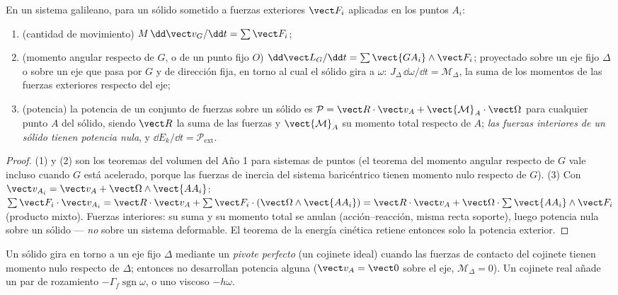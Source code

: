 \begin{theorem}\label{thm:b2:rigid-body-mechanics:laws}
En un sistema galileano, para un sólido sometido a fuerzas exteriores $\vect F_i$
aplicadas en los puntos $A_i$:
\begin{enumerate}
  \item (cantidad de movimiento) $M\,\dd\vect v_G/\dd t = \sum\vect F_i$;
  \item (momento angular respecto de $G$, o de un punto fijo $O$)
        $\dd\vect L_G/\dd t = \sum\vect{GA_i}\wedge\vect F_i$; proyectado
        sobre un eje fijo $\Delta$ o sobre un eje que pasa por $G$ y de
        dirección fija, en torno al cual el sólido gira a $\omega$:
        $J_\Delta\,\dd\omega/\dd t = \mathcal M_\Delta$, la suma de los
        momentos de las fuerzas exteriores respecto del eje;
  \item (potencia) la potencia de un conjunto de fuerzas sobre un sólido es
        $\mathcal P = \vect R\cdot\vect v_A + \vect{\mathcal M}_A\cdot
        \vect\Omega$ para cualquier punto $A$ del sólido, siendo $\vect R$ la
        suma de las fuerzas y $\vect{\mathcal M}_A$ su momento total
        respecto de $A$; \emph{las fuerzas interiores de un sólido tienen
        potencia nula}, y $\dd E_k/\dd t = \mathcal P_{\text{ext}}$.
\end{enumerate}
\end{theorem}

\begin{proof}
(1) y (2) son los teoremas del volumen del Año 1 para sistemas de puntos
(el teorema del momento angular respecto de $G$ vale incluso cuando $G$
está acelerado, porque las fuerzas de inercia del sistema baricéntrico
tienen momento nulo respecto de $G$). (3) Con $\vect v_{A_i} = \vect v_A + \vect\Omega
\wedge\vect{AA_i}$: $\sum\vect F_i\cdot\vect v_{A_i} = \vect R\cdot\vect v_A
+ \sum\vect F_i\cdot(\vect\Omega\wedge\vect{AA_i}) = \vect R\cdot\vect v_A +
\vect\Omega\cdot\sum\vect{AA_i}\wedge\vect F_i$ (producto mixto). Fuerzas
interiores: su suma y su momento total se anulan (acción--reacción, misma
recta soporte), luego potencia nula sobre un sólido --- \emph{no} sobre un
sistema deformable. El teorema de la energía cinética retiene entonces solo la potencia exterior.
\end{proof}

\begin{definition}\label{def:b2:rigid-body-mechanics:pivot}
Un sólido gira en torno a un eje fijo $\Delta$ mediante un \emph{pivote
perfecto} (un cojinete ideal) cuando las fuerzas de contacto del cojinete
tienen momento nulo respecto de $\Delta$; entonces no desarrollan potencia
alguna ($\vect v_A = \vect 0$ sobre el eje, $\mathcal M_\Delta = 0$). Un
cojinete real añade un par de rozamiento $-\Gamma_f\operatorname{sgn}\omega$,
o uno viscoso $-h\omega$.
\end{definition}

